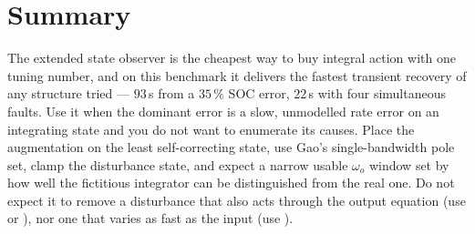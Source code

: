 \section{Summary}
The extended state observer is the cheapest way to buy integral action with one tuning number,
and on this benchmark it delivers the fastest transient recovery of any structure tried ---
$93$\,s from a $35\,\%$ SOC error, $22$\,s with four simultaneous faults.  Use it when the
dominant error is a slow, unmodelled rate error on an integrating state and you do not want to
enumerate its causes.  Place the augmentation on the least self-correcting state, use Gao's
single-bandwidth pole set, clamp the disturbance state, and expect a narrow usable $\omega_o$
window set by how well the fictitious integrator can be distinguished from the real one.  Do not
expect it to remove a disturbance that also acts through the output equation (use
 or ), nor one that varies as fast as the input (use
).
